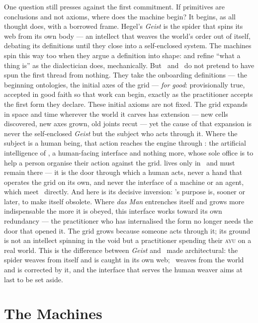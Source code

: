 One question still presses against the first commitment. If primitives are
conclusions and not axioms, where does the machine begin? It begins, as all
thought does, with a borrowed frame. Hegel's \emph{Geist} is the spider that spins
its web from its own body --- an intellect that weaves the world's order out of
itself, debating its definitions until they close into a self-enclosed system. The
machines spin this way too when they argue a definition into shape: 
and  refine ``what a thing is'' as the dialectician does,
mechanically. But \physis\ and \praxis\ do not pretend to have spun the first
thread from nothing. They take the onboarding definitions --- the beginning
ontologies, the initial axes of the grid --- \emph{for good}: provisionally true,
accepted in good faith so that work can begin, exactly as the practitioner accepts
the first form they declare. These initial axioms are not fixed. The grid expands in
space and time wherever the world it carves has extension --- new cells
discovered, new axes grown, old joints recut --- yet the cause of that expansion is
never the self-enclosed \emph{Geist} but the subject who acts through it. Where the
subject is a human being, that action reaches the engine through :
the artificial intelligence of \praxis, a human-facing interface and nothing more,
whose sole office is to help a person organise their action against the grid.
 lives only in \praxis\ and must remain there --- it is the door
through which a human acts, never a hand that operates the grid on its own, and
never the interface of a machine or an agent, which meet \physis\ directly. And
here is its decisive inversion: 's purpose is, sooner or later, to
make itself obsolete. Where \emph{das Man} entrenches itself and grows more
indispensable the more it is obeyed, this interface works toward its own redundancy
--- the practitioner who has internalised the form no longer needs the door that
opened it. The grid grows because someone acts through it; its ground is not an
intellect spinning in the void but a practitioner spending their \textsc{ayu} on a
real world. This is the difference between \emph{Geist} and \physis\ made
architectural: the spider weaves from itself and is caught in its own web; \physis\
weaves from the world and is corrected by it, and the interface that serves the
human weaver aims at last to be set aside.

\section*{The Machines}

